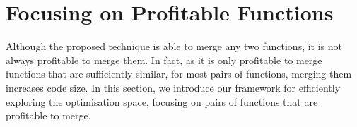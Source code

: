 \section{Focusing on Profitable Functions}
\label{sec:framework}


Although the proposed technique is able to merge any two functions, it is not always profitable to merge them. In fact, as it is only
profitable to merge functions that are sufficiently similar, for most pairs of functions, merging them increases code size.
In this section, we introduce our framework for efficiently exploring the
optimisation space, focusing on pairs of functions that are profitable to merge. 




